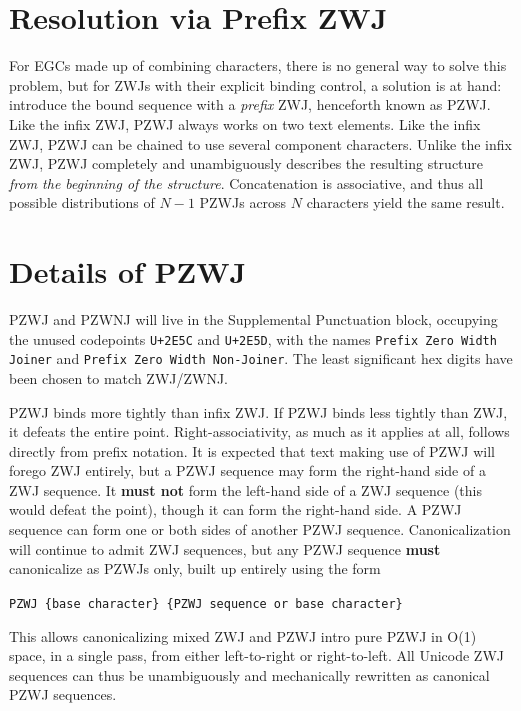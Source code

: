 \documentclass[letterpaper,10pt]{article}
\begin{document}
\section{Resolution via Prefix ZWJ}

For EGCs made up of combining characters, there is no general way to
solve this problem, but for ZWJs with their explicit binding control,
a solution is at hand: introduce the bound sequence with a \textit{prefix}
ZWJ, henceforth known as PZWJ. Like the infix ZWJ, PZWJ always works on two
text elements. Like the infix ZWJ, PZWJ can be chained to use several
component characters. Unlike the infix ZWJ, PZWJ completely and
unambiguously describes the resulting structure \textit{from the beginning of
the structure}. Concatenation is associative\cite{automata}, and thus all
possible distributions of $N-1$ PZWJs across $N$ characters yield the same
result.

\section{Details of PZWJ}

PZWJ and PZWNJ will live in the Supplemental Punctuation block, occupying the
unused codepoints \texttt{U+2E5C} and \texttt{U+2E5D}, with the names
\texttt{Prefix Zero Width Joiner} and \texttt{Prefix Zero Width Non-Joiner}.
The least significant hex digits have been chosen to match ZWJ/ZWNJ.

PZWJ binds more tightly than infix ZWJ. If PZWJ binds less tightly than ZWJ,
it defeats the entire point. Right-associativity, as much as it applies at
all, follows directly from prefix notation. It is expected that text making
use of PZWJ will forego ZWJ entirely, but a PZWJ sequence may form the right-hand
side of a ZWJ sequence. It \textbf{must not} form the left-hand side of a
ZWJ sequence (this would defeat the point), though it can form the right-hand
side. A PZWJ sequence can form one or both sides of another PZWJ sequence.
Canonicalization will continue to admit ZWJ sequences, but any PZWJ sequence
\textbf{must} canonicalize as PZWJs only, built up entirely using the form

\begin{center}
\texttt{PZWJ \{base character\} \{PZWJ sequence or base character\}}
\end{center}

This allows canonicalizing mixed ZWJ and PZWJ intro pure PZWJ in O(1) space,
in a single pass, from either left-to-right or right-to-left. All Unicode ZWJ
sequences can thus be unambiguously and mechanically rewritten as canonical
PZWJ sequences.
\end{document}
